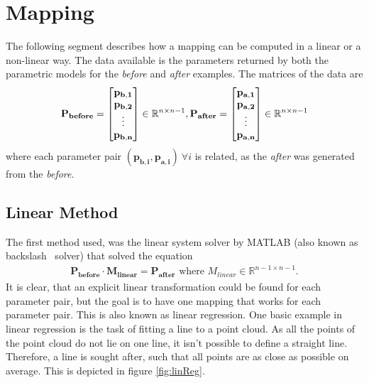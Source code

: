 \section{Mapping}
The following segment describes how a mapping can be computed in a linear or a non-linear way. The data available is the parameters returned by both the parametric models for the \textit{before} and \textit{after} examples. The matrices of the data are
\begin{gather}
  \mathbf{P_{before}} =
  \begin{bmatrix}
    \mathbf{p_{b,1}} \\
    \mathbf{p_{b,2}}  \\
    \vdots \\
    \mathbf{p_{b,n}}
  \end{bmatrix}
  \in \mathbb{R}^{n \times n-1},
  \mathbf{P_{after}} =
  \begin{bmatrix}
    \mathbf{p_{a,1}} \\
    \mathbf{p_{a,2}} \\
    \vdots \\
    \mathbf{p_{a,n}}
  \end{bmatrix}
  \in \mathbb{R}^{n \times n-1}
\end{gather}
where each parameter pair $(\mathbf{p_{b,i}}, \mathbf{p_{a,i}})\ \forall i$ is related, as the \textit{after} was generated from the \textit{before}.

\subsection{Linear Method}
The first method used, was the linear system solver by MATLAB (also known as backslash \ solver) that solved the equation
\begin{gather}
  \mathbf{P_{before}} \cdot \mathbf{M_{linear}} = \mathbf{P_{after}}
  \text{ where } M_{linear} \in \mathbb{R}^{n-1 \times n-1}.
\end{gather}
It is clear, that an explicit linear transformation could be found for each parameter pair, but the goal is to have one mapping that works for each parameter pair. This is also known as linear regression. One basic example in linear regression is the task of fitting a line to a point cloud. As all the points of the point cloud do not lie on one line, it isn't possible to define a straight line. Therefore, a line is sought after, such that all points are as close as possible on average. This is depicted in figure \ref{fig:linReg}.

